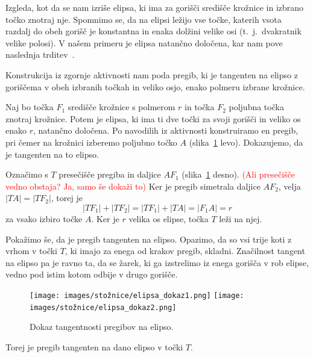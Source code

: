
Izgleda, kot da se nam izriše elipsa, ki ima za gorišči središče krožnice in izbrano točko znotraj nje. Spomnimo se, da na elipsi ležijo vse točke, katerih vsota razdalj do obeh gorišč je konstantna in enaka dolžini velike osi (t.\ j.\ dvakratnik velike polosi). V našem primeru je elipsa natančno določena, kar nam pove naslednja trditev~\cite[str.\ 60--61]{hull2013}.

\begin{trditev}
    Konstrukcija iz zgornje aktivnosti nam poda pregib, ki je tangenten na elipso z goriščema v obeh izbranih točkah in veliko osjo, enako polmeru izbrane krožnice.
\end{trditev}

\begin{dokaz}
    Naj bo točka $F_1$ središče krožnice s polmerom $r$ in točka $F_2$ poljubna točka znotraj krožnice. Potem je elipsa, ki ima ti dve točki za svoji gorišči in veliko os enako $r$, natančno določena. Po navodilih iz aktivnosti konstruiramo en pregib, pri čemer na krožnici izberemo poljubno točko $A$ (slika~\ref{fig:dokaz_elipsa} levo). Dokazujemo, da je tangenten na to elipso.

    Označimo s $T$ presečišče pregiba in daljice $AF_1$ (slika~\ref{fig:dokaz_elipsa} desno). \textcolor{red}{(Ali presečišče vedno obstaja? Ja, samo še dokaži to)} Ker je pregib simetrala daljice $AF_2$, velja $|TA| = |TF_2|$, torej je
    $$|TF_1| + |TF_2| = |TF_1| + |TA| = |F_1A| = r$$
    za vsako izbiro točke $A$. Ker je $r$ velika os elipse, točka $T$ leži na njej.

    Pokažimo še, da je pregib tangenten na elipso. Opazimo, da so vsi trije koti z vrhom v točki $T$, ki imajo za enega od krakov pregib, skladni. Značilnost tangent na elipso pa je ravno ta, da se žarek, ki ga izstrelimo iz enega gorišča v rob elipse, vedno pod istim kotom odbije v drugo gorišče.
    \begin{figure}[h]
        \centering
        \texttt{[image: images/stožnice/elipsa\_dokaz1.png]}
        \texttt{[image: images/stožnice/elipsa\_dokaz2.png]}
        \caption[Tangentnost na elipso]{Dokaz tangentnosti pregibov na elipso.}
        \label{fig:dokaz_elipsa}
    \end{figure}
    Torej je pregib tangenten na dano elipso v točki $T$.
\end{dokaz}

